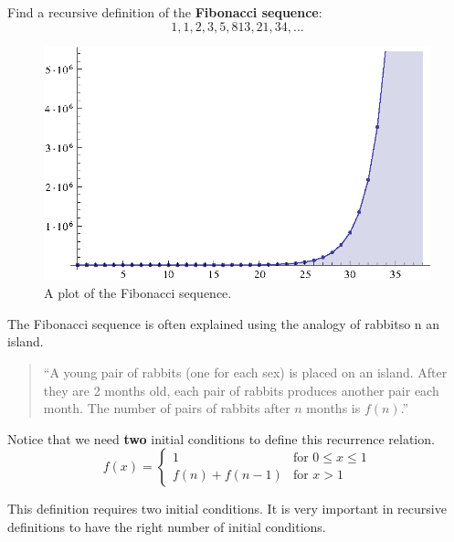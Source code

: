 \begin{ex}
  Find a recursive definition of the \textbf{Fibonacci sequence}:
  \[ 1, 1, 2, 3, 5, 8 13, 21, 34, \ldots \]
  \begin{figure}[h]
    \begin{center}
      \includegraphics{discrete/recursion/fibonacci.eps}
    \end{center}
    \caption{A plot of the Fibonacci sequence.}
    \label{fig:fibonacci}
  \end{figure}

  The Fibonacci sequence is often explained using the analogy of rabbitso n an
  island.
  \begin{quote}
    ``A young pair of rabbits (one for each sex) is placed on an island. After
    they are 2 months old, each pair of rabbits produces another pair each month.
    The number of pairs of rabbits after $n$ months is $f(n)$.''
  \end{quote}
  \begin{sol}
    Notice that we need \textbf{two} initial conditions to define this
    recurrence relation.
    \begin{equation}
      f(x) =
      \begin{cases}
        1 & \text{for }0 \leq x \leq 1 \\
        f(n) + f(n-1) &\text{for } x > 1
      \end{cases}
    \end{equation}
  \end{sol}
  \begin{note}
    This definition requires two initial conditions. It is very important in recursive definitions to have the right number of initial conditions.
  \end{note}
\end{ex}
